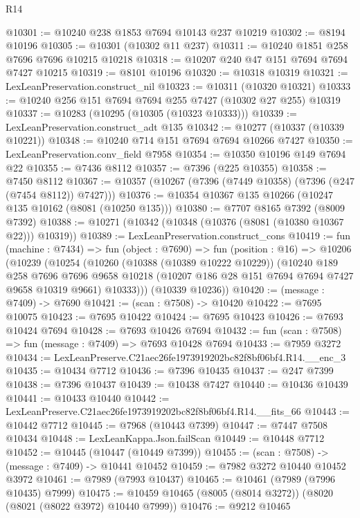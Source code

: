 \begin{lexlean}{R14}
\begin{coremodule}
@10301 := @10240 @238 @1853 @7694 @10143 @237 @10219
@10302 := @8194 @10196
@10305 := @10301 (@10302 @11 @237)
@10311 := @10240 @1851 @258 @7696 @7696 @10215 @10218
@10318 := @10207 @240 @47 @151 @7694 @7694 @7427 @10215
@10319 := @8101 @10196
@10320 := @10318 @10319
@10321 := LexLeanPreservation.construct_nil
@10323 := @10311 (@10320 @10321)
@10333 := @10240 @256 @151 @7694 @7694 @255 @7427 (@10302 @27 @255) @10319
@10337 := @10283 (@10295 (@10305 (@10323 @10333)))
@10339 := LexLeanPreservation.construct_adt @135
@10342 := @10277 (@10337 (@10339 @10221))
@10348 := @10240 @714 @151 @7694 @7694 @10266 @7427
@10350 := LexLeanPreservation.conv_field @7958
@10354 := @10350 @10196 @149 @7694 @22
@10355 := @7436 @8112
@10357 := @7396 (@225 @10355)
@10358 := @7450 @8112
@10367 := @10357 (@10267 (@7396 (@7449 @10358) (@7396 (@247 (@7454 @8112)) @7427)))
@10376 := @10354 @10367 @135 @10266 (@10247 @135 @10162 (@8081 (@10250 @135)))
@10380 := @7707 @8165 @7392 (@8009 @7392)
@10388 := @10271 (@10342 (@10348 (@10376 (@8081 (@10380 @10367 @22))) @10319))
@10389 := LexLeanPreservation.construct_cons
@10419 := fun (machine : @7434) =>
  fun (object : @7690) =>
  fun (position : @16) =>
  @10206
    (@10239
      (@10254
        (@10260
          (@10388 (@10389 @10222 @10229))
          (@10240
            @189
            @258
            @7696
            @7696
            @9658
            @10218
            (@10207 @186 @28 @151 @7694 @7694 @7427 @9658 @10319 @9661)
            @10333)))
      (@10339 @10236))
@10420 := (message : @7409) -> @7690
@10421 := (scan : @7508) -> @10420
@10422 := @7695 @10075
@10423 := @7695 @10422
@10424 := @7695 @10423
@10426 := @7693 @10424 @7694
@10428 := @7693 @10426 @7694
@10432 := fun (scan : @7508) => fun (message : @7409) => @7693 @10428 @7694
@10433 := @7959 @3272
@10434 := LexLeanPreserve.C21aec26fe1973919202bc82f8bf06bf4.R14.__enc_3
@10435 := @10434 @7712
@10436 := @7396 @10435
@10437 := @247 @7399
@10438 := @7396 @10437
@10439 := @10438 @7427
@10440 := @10436 @10439
@10441 := @10433 @10440
@10442 := LexLeanPreserve.C21aec26fe1973919202bc82f8bf06bf4.R14.__fits_66
@10443 := @10442 @7712
@10445 := @7968 (@10443 @7399)
@10447 := @7447 @7508 @10434
@10448 := LexLeanKappa.Json.failScan
@10449 := @10448 @7712
@10452 := @10445 (@10447 (@10449 @7399))
@10455 := (scan : @7508) -> (message : @7409) -> @10441 @10452
@10459 := @7982 @3272 @10440 @10452 @3972
@10461 := @7989 (@7993 @10437)
@10465 := @10461 (@7989 (@7996 @10435) @7999)
@10475 := @10459 @10465 (@8005 (@8014 @3272)) (@8020 (@8021 (@8022 @3972) @10440 @7999))
@10476 := @9212 @10465

\end{coremodule}
\end{lexlean}
